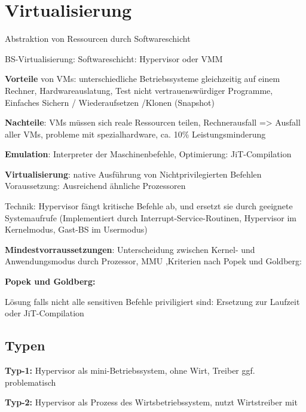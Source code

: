 \section{Virtualisierung}
Abstraktion von Ressourcen durch Softwareschicht

BS-Virtualisierung: Softwareschicht: Hypervisor oder VMM

\textbf{Vorteile} von VMs: unterschiedliche Betriebssysteme gleichzeitig auf einem Rechner, Hardwareauslatung, Test nicht vertrauenswürdiger Programme, Einfaches Sichern / Wiederaufsetzen /Klonen (Snapshot)

\textbf{Nachteile}: VMs müssen sich reale Ressourcen teilen, Rechnerausfall =>  Ausfall aller VMs, probleme mit spezialhardware, ca. 10\% Leistungsminderung


\textbf{Emulation}: Interpreter der Maschinenbefehle, Optimierung: JiT-Compilation

\textbf{Virtualisierung}: native Ausführung von Nichtprivilegierten Befehlen
Voraussetzung: Ausreichend ähnliche Prozessoren

Technik: Hypervisor fängt kritische Befehle ab, und ersetzt sie durch geeignete Systemaufrufe 
(Implementiert durch Interrupt-Service-Routinen, Hypervisor im Kernelmodus, Gast-BS im Usermodus)


\textbf{Mindestvorraussetzungen}: Unterscheidung zwischen Kernel- und Anwendungsmodus durch 
Prozessor, MMU ,Kriterien nach Popek und Goldberg:

\textbf{Popek und Goldberg: }


Lösung falls nicht alle sensitiven Befehle priviligiert sind: Ersetzung zur Laufzeit oder JiT-Compilation

\subsection{Typen}
\textbf{Typ-1:} Hypervisor als mini-Betriebssystem, ohne Wirt, Treiber ggf. problematisch

\textbf{Typ-2:} Hypervisor als Prozess des Wirtsbetriebssystem, nutzt Wirtstreiber mit


